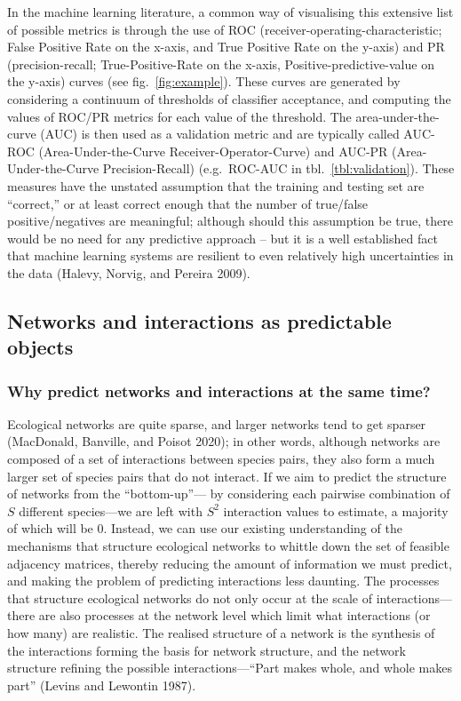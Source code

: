 \documentclass[11pt]{article}
\begin{document}
In the machine learning literature, a common way of visualising this
extensive list of possible metrics is through the use of ROC
(receiver-operating-characteristic; False Positive Rate on the x-axis,
and True Positive Rate on the y-axis) and PR (precision-recall;
True-Positive-Rate on the x-axis, Positive-predictive-value on the
y-axis) curves (see fig.~\ref{fig:example}). These curves are generated
by considering a continuum of thresholds of classifier acceptance, and
computing the values of ROC/PR metrics for each value of the threshold.
The area-under-the-curve (AUC) is then used as a validation metric and
are typically called AUC-ROC (Area-Under-the-Curve
Receiver-Operator-Curve) and AUC-PR (Area-Under-the-Curve
Precision-Recall) (e.g.~ROC-AUC in tbl.~\ref{tbl:validation}). These
measures have the unstated assumption that the training and testing set
are ``correct,'' or at least correct enough that the number of
true/false positive/negatives are meaningful; although should this
assumption be true, there would be no need for any predictive approach
-- but it is a well established fact that machine learning systems are
resilient to even relatively high uncertainties in the data (Halevy,
Norvig, and Pereira 2009).

\hypertarget{networks-and-interactions-as-predictable-objects}{%
\subsection{Networks and interactions as predictable
objects}\label{networks-and-interactions-as-predictable-objects}}

\hypertarget{why-predict-networks-and-interactions-at-the-same-time}{%
\subsubsection{Why predict networks and interactions at the same
time?}\label{why-predict-networks-and-interactions-at-the-same-time}}

Ecological networks are quite sparse, and larger networks tend to get
sparser (MacDonald, Banville, and Poisot 2020); in other words, although
networks are composed of a set of interactions between species pairs,
they also form a much larger set of species pairs that do not interact.
If we aim to predict the structure of networks from the ``bottom-up''---
by considering each pairwise combination of \(S\) different species---we
are left with \(S^2\) interaction values to estimate, a majority of
which will be 0. Instead, we can use our existing understanding of the
mechanisms that structure ecological networks to whittle down the set of
feasible adjacency matrices, thereby reducing the amount of information
we must predict, and making the problem of predicting interactions less
daunting. The processes that structure ecological networks do not only
occur at the scale of interactions---there are also processes at the
network level which limit what interactions (or how many) are realistic.
The realised structure of a network is the synthesis of the interactions
forming the basis for network structure, and the network structure
refining the possible interactions---``Part makes whole, and whole makes
part'' (Levins and Lewontin 1987).
\end{document}
